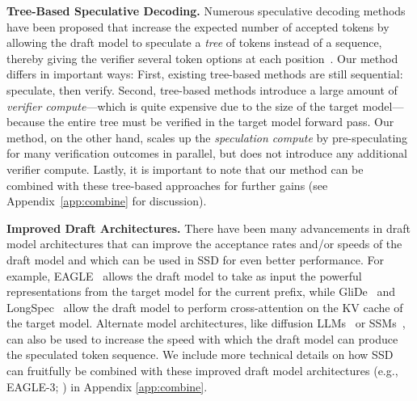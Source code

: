 \textbf{Tree-Based Speculative Decoding.}
Numerous speculative decoding methods have been proposed that increase the expected number of accepted tokens by allowing the draft model to speculate a \textit{tree} of tokens instead of a sequence, thereby giving the verifier several token options at each position~\citep{specinfer,eagle2,sequoia,specexec}.
Our method differs in important ways:
First, existing tree-based methods are still sequential: speculate, then verify.
Second, tree-based methods introduce a large amount of \textit{verifier compute}---which is quite expensive due to the size of the target model---because the entire tree must be verified in the target model forward pass.
Our method, on the other hand, scales up the \textit{speculation compute} by pre-speculating for many verification outcomes in parallel, but does not introduce any additional verifier compute.
Lastly, it is important to note that our method can be combined with these tree-based approaches for further gains (see Appendix~\ref{app:combine} for discussion). 

\textbf{Improved Draft Architectures.}
There have been many advancements in draft model architectures that can improve the acceptance rates and/or speeds of the draft model and which can be used in SSD for even better performance.
For example, EAGLE~\citep{eagle,eagle2,eagle3} allows the draft model to take as input the powerful representations from the target model for the current prefix, while GliDe~\citep{du2024glidecapelowhasslemethod} and LongSpec~\citep{yang2025longspeclongcontextlosslessspeculative} allow the draft model to perform cross-attention on the KV cache of the target model.
Alternate model architectures, like diffusion LLMs~\citep{Nie2025LargeLanguageDiffusionModels, sahoo2024simple,diffuspec,specdiff,llmfuture,dflash} or SSMs~\citep{gu2022efficiently, Gu2024Mamba,mamballama}, can also be used to increase the speed with which the draft model can produce the speculated token sequence.
We include more technical details on how SSD can fruitfully be combined with these improved draft model architectures (e.g., EAGLE-3; \cite{eagle3}) in Appendix \ref{app:combine}.

\color{black}
